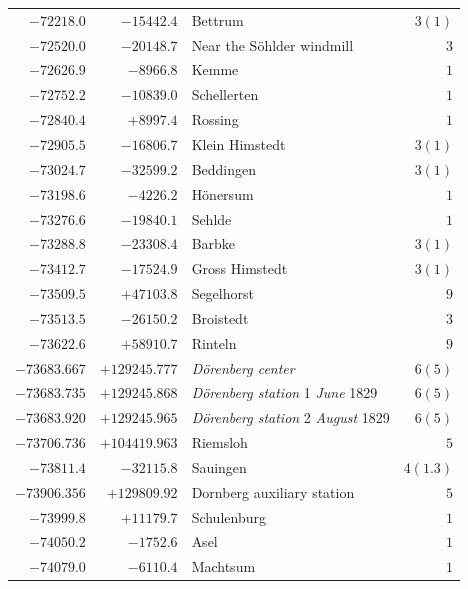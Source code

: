\begin{center}
\begin{tabular}{r|r|p{170pt}|r}
\(-72218.0\)&\(-15442.4\)&Bettrum&\(3 (1)\)\\
\(-72520.0\)&\(-20148.7\)&Near the Söhlder windmill&\(3\)\\
\(-72626.9\)&\(-8966.8\)&Kemme&\(1\)\\
\(-72752.2\)&\(-10839.0\)&Schellerten&\(1\)\\
\(-72840.4\)&\(+8997.4\)&Rossing&\(1\)\\
\(-72905.5\)&\(-16806.7\)&Klein Himstedt&\(3 (1)\)\\
\(-73024.7\)&\(-32599.2\)&Beddingen&\(3 (1)\)\\
\(-73198.6\)&\(-4226.2\)&Hönersum&\(1\)\\
\(-73276.6\)&\(-19840.1\)&Sehlde&\(1\)\\
\(-73288.8\)&\(-23308.4\)&Barbke&\(3 (1)\)\\
\(-73412.7\)&\(-17524.9\)&Gross Himstedt&\(3 (1)\)\\
\(-73509.5\)&\(+47103.8\)&Segelhorst&\(9\)\\
\(-73513.5\)&\(-26150.2\)&Broistedt&\(3\)\\
\(-73622.6\)&\(+58910.7\)&Rinteln&\(9\)\\
\(-73683.667\)&\(+129245.777\)&\textit{Dörenberg center}&\(6 (5)\)\\
\(-73683.735\)&\(+129245.868\)&\textit{Dörenberg station} 1 \textit{June} 1829&\(6 (5)\)\\
\(-73683.920\)&\(+129245.965\)&\textit{Dörenberg station} 2 \textit{August} 1829&\(6 (5)\)\\
\(-73706.736\)&\(+104419.963\)&Riemsloh&\(5\)\\
\(-73811.4\)&\(-32115.8\)&Sauingen&\(4(1.3)\)\\
\(-73906.356\)&\(+129809.92\)&Dornberg auxiliary station&\(5\)\\
\(-73999.8\)&\(+11179.7\)&Schulenburg&\(1\)\\
\(-74050.2\)&\(-1752.6\)&Asel&\(1\)\\
\(-74079.0\)&\(-6110.4\)&Machtsum&\(1\)\\
\hline\end{tabular}\endgroup\end{center}
